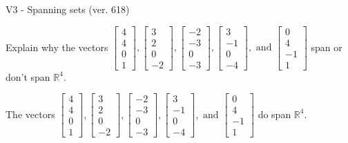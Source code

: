 \begin{exercise}
  \begin{exerciseTitle}V3 - Spanning sets (ver. 618)\end{exerciseTitle}
  \begin{exerciseStatement}
    Explain why the vectors \(\left[\begin{array}{r}
4 \\
4 \\
0 \\
1
\end{array}\right] , \left[\begin{array}{r}
3 \\
2 \\
0 \\
-2
\end{array}\right] , \left[\begin{array}{r}
-2 \\
-3 \\
0 \\
-3
\end{array}\right] , \left[\begin{array}{r}
3 \\
-1 \\
0 \\
-4
\end{array}\right] , \text{ and } \left[\begin{array}{r}
0 \\
4 \\
-1 \\
1
\end{array}\right]\) span or don't span \(\mathbb{R}^4\). 
	


  \end{exerciseStatement}
  \begin{exerciseAnswer}
   The vectors \(\left[\begin{array}{r}
4 \\
4 \\
0 \\
1
\end{array}\right] , \left[\begin{array}{r}
3 \\
2 \\
0 \\
-2
\end{array}\right] , \left[\begin{array}{r}
-2 \\
-3 \\
0 \\
-3
\end{array}\right] , \left[\begin{array}{r}
3 \\
-1 \\
0 \\
-4
\end{array}\right] , \text{ and } \left[\begin{array}{r}
0 \\
4 \\
-1 \\
1
\end{array}\right]\) 
  	 do  
	span \(\mathbb{R}^4\).
  


  \end{exerciseAnswer}
\end{exercise}